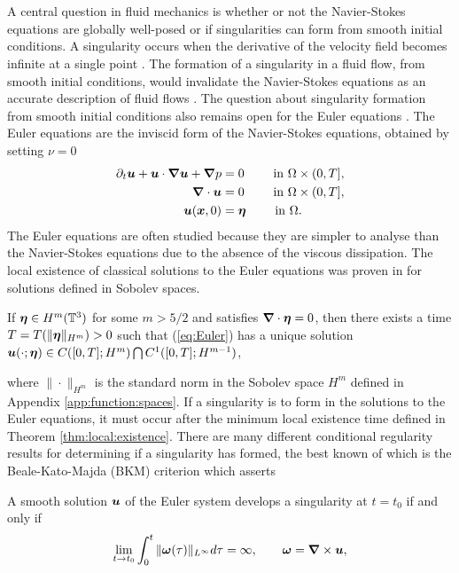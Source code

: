 \\~\\
A central question in fluid mechanics is whether or not the Navier-Stokes equations are globally well-posed or if singularities can form from smooth initial conditions. A singularity occurs when the derivative of the velocity field becomes infinite at a single point \cite{moffatt_singularities_2019}. The formation of a singularity in a fluid flow, from smooth initial conditions, would invalidate the Navier-Stokes equations as an accurate description of fluid flows \cite{protas_systematic_2022}. The question about singularity formation from smooth initial conditions also remains open for the Euler equations \cite{gibbon_three-dimensional_2008}. The Euler equations are the inviscid form of the Navier-Stokes equations, obtained by setting $\nu=0$
\begin{subequations}\label{eq:Euler}
\begin{align}
\partial_t \boldsymbol u + \boldsymbol u\cdot {\boldsymbol \nabla} \boldsymbol u + {\boldsymbol \nabla} p &= 0 \qquad\text{ in } \Omega\times (0,T],\\
{\boldsymbol \nabla} \cdot \boldsymbol u &= 0 \qquad\text{ in } \Omega\times (0,T],\\
\boldsymbol u(\boldsymbol x,0) &= {\boldsymbol \eta} \qquad\text{ in }\Omega.
\end{align}
\end{subequations}
The Euler equations are often studied because they are simpler to analyse than the Navier-Stokes equations due to the absence of the viscous dissipation. The local existence of classical solutions to the Euler equations was proven in \cite{kato_nonstationary_1972} for solutions defined in Sobolev spaces. 
\begin{thm}\label{thm:local:existence}
If ${\boldsymbol \eta}\in H^m(\mathbb{T}^3)$ for some $m>5/2$ and satisfies ${\boldsymbol \nabla}\cdot{\boldsymbol \eta} = 0$, then there exists a time $T=T(\|{\boldsymbol \eta}\|_{H^m})>0$ such that (\ref{eq:Euler}) has a unique solution $\boldsymbol u(\cdot;{\boldsymbol \eta})\in C([0,T];H^m)\bigcap C^1([0,T];H^{m-1})$,
\end{thm}
\noindent where $\|\cdot\|_{H^m}$ is the standard norm in the Sobolev space $H^m$ defined in Appendix \ref{app:function:spaces}. If a singularity is to form in the solutions to the Euler equations, it must occur after the minimum local existence time defined in Theorem \ref{thm:local:existence}. There are many different conditional regularity results for determining if a singularity has formed, the best known of which is the Beale-Kato-Majda (BKM) criterion \cite{beale_remarks_1984} which asserts
\begin{thm}\label{thm:beale:kato:majda}
A smooth solution $\boldsymbol u$ of the Euler system develops a singularity at $t=t_0$ if and only if\\
\begin{equation}
\lim_{t\rightarrow t_0}\int_0^t \|\boldsymbol\omega(\tau)\|_{L^\infty} d\tau = \infty, \qquad \boldsymbol\omega = {\boldsymbol \nabla} \times \boldsymbol u,
\end{equation}
\end{thm}
